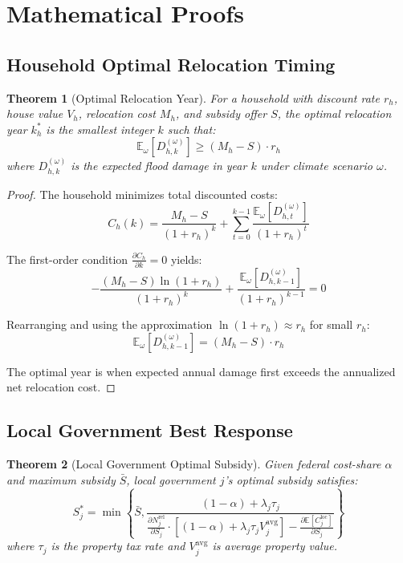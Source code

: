 \documentclass[12pt,a4paper]{article}
\newtheorem{theorem}{Theorem}
\begin{document}
\appendix

\section{Mathematical Proofs}\label{app:proofs}

\subsection{Household Optimal Relocation Timing}

\begin{theorem}[Optimal Relocation Year]
For a household with discount rate $r_h$, house value $V_h$, relocation cost $M_h$, and subsidy offer $S$, the optimal relocation year $k_h^*$ is the smallest integer $k$ such that:
\begin{equation}
\mathbb{E}_\omega[D_{h,k}^{(\omega)}] \geq (M_h - S) \cdot r_h
\end{equation}
where $D_{h,k}^{(\omega)}$ is the expected flood damage in year $k$ under climate scenario $\omega$.
\end{theorem}

\begin{proof}
The household minimizes total discounted costs:
\[
C_h(k) = \frac{M_h - S}{(1+r_h)^k} + \sum_{t=0}^{k-1} \frac{\mathbb{E}_\omega[D_{h,t}^{(\omega)}]}{(1+r_h)^t}
\]

The first-order condition $\frac{\partial C_h}{\partial k} = 0$ yields:
\[
-\frac{(M_h - S) \ln(1+r_h)}{(1+r_h)^k} + \frac{\mathbb{E}_\omega[D_{h,k-1}^{(\omega)}]}{(1+r_h)^{k-1}} = 0
\]

Rearranging and using the approximation $\ln(1+r_h) \approx r_h$ for small $r_h$:
\[
\mathbb{E}_\omega[D_{h,k-1}^{(\omega)}] = (M_h - S) \cdot r_h
\]

The optimal year is when expected annual damage first exceeds the annualized net relocation cost.
\end{proof}

\subsection{Local Government Best Response}

\begin{theorem}[Local Government Optimal Subsidy]
Given federal cost-share $\alpha$ and maximum subsidy $\bar{S}$, local government $j$'s optimal subsidy satisfies:
\begin{equation}
S_j^* = \min\left\{\bar{S}, \frac{(1-\alpha) + \lambda_j \tau_j}{\frac{\partial N_j^{\text{rel}}}{\partial S_j} \cdot \left[(1-\alpha) + \lambda_j \tau_j V_j^{\text{avg}}\right] - \frac{\partial \mathbb{E}[C_j^{\text{loc}}]}{\partial S_j}}\right\}
\end{equation}
where $\tau_j$ is the property tax rate and $V_j^{\text{avg}}$ is average property value.
\end{theorem}
\end{document}
